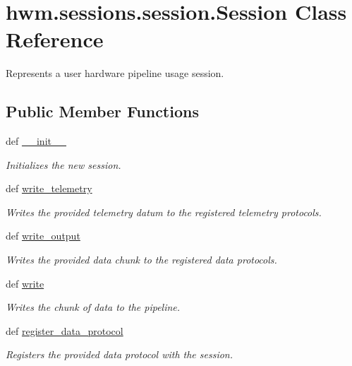 \hypertarget{classhwm_1_1sessions_1_1session_1_1_session}{\section{hwm.\-sessions.\-session.\-Session Class Reference}
\label{classhwm_1_1sessions_1_1session_1_1_session}
}


Represents a user hardware pipeline usage session.  


\subsection*{Public Member Functions}
\begin{DoxyCompactItemize}
\item 
def \hyperlink{classhwm_1_1sessions_1_1session_1_1_session_afe7c8702e8502c36cd300226e81121c6}{\-\_\-\-\_\-init\-\_\-\-\_\-}
\begin{DoxyCompactList}\small\item\em Initializes the new session. \end{DoxyCompactList}\item 
def \hyperlink{classhwm_1_1sessions_1_1session_1_1_session_a13b88831137e474313c55eecc55e09d5}{write\-\_\-telemetry}
\begin{DoxyCompactList}\small\item\em Writes the provided telemetry datum to the registered telemetry protocols. \end{DoxyCompactList}\item 
def \hyperlink{classhwm_1_1sessions_1_1session_1_1_session_a26619312f19b5f19f939bf72f864ff3e}{write\-\_\-output}
\begin{DoxyCompactList}\small\item\em Writes the provided data chunk to the registered data protocols. \end{DoxyCompactList}\item 
def \hyperlink{classhwm_1_1sessions_1_1session_1_1_session_ae89be342f479669229a72028120cc2a2}{write}
\begin{DoxyCompactList}\small\item\em Writes the chunk of data to the pipeline. \end{DoxyCompactList}\item 
def \hyperlink{classhwm_1_1sessions_1_1session_1_1_session_a48e131f82f7c51b83484047c8ee40603}{register\-\_\-data\-\_\-protocol}
\begin{DoxyCompactList}\small\item\em Registers the provided data protocol with the session. \end{DoxyCompactList}\item 

\end{DoxyCompactItemize}
